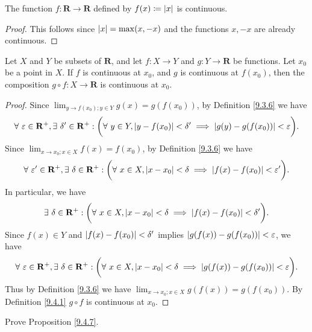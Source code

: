 \begin{proposition}\label{9.4.12}
    The function \(f : \mathbf{R} \to \mathbf{R}\) defined by \(f(x) \coloneqq \abs*{x}\) is continuous.
\end{proposition}

\begin{proof}
    This follows since \(\abs*{x} = \max(x, -x)\) and the functions \(x, -x\) are already continuous.
\end{proof}

\begin{proposition}\label{9.4.13}
    Let \(X\) and \(Y\) be subsets of \(\mathbf{R}\), and let \(f : X \to Y\) and \(g : Y \to \mathbf{R}\) be functions.
    Let \(x_0\) be a point in \(X\).
    If \(f\) is continuous at \(x_0\), and \(g\) is continuous at \(f(x_0)\), then the composition \(g \circ f : X \to \mathbf{R}\) is continuous at \(x_0\).
\end{proposition}

\begin{proof}
    Since \(\lim_{y \to f(x_0) ; y \in Y} g(x) = g(f(x_0))\), by Definition \ref{9.3.6} we have
    \[
        \forall\ \varepsilon \in \mathbf{R}^+, \exists\ \delta' \in \mathbf{R}^+ : \bigg(\forall\ y \in Y, \abs*{y - f(x_0)} < \delta' \implies \abs*{g(y) - g(f(x_0))} < \varepsilon\bigg).
    \]
    Since \(\lim_{x \to x_0 ; x \in X} f(x) = f(x_0)\), by Definition \ref{9.3.6} we have
    \[
        \forall\ \varepsilon' \in \mathbf{R}^+, \exists\ \delta \in \mathbf{R}^+ : \bigg(\forall\ x \in X, \abs*{x - x_0} < \delta \implies \abs*{f(x) - f(x_0)} < \varepsilon'\bigg).
    \]
    In particular, we have
    \[
        \exists\ \delta \in \mathbf{R}^+ : \bigg(\forall\ x \in X, \abs*{x - x_0} < \delta \implies \abs*{f(x) - f(x_0)} < \delta'\bigg).
    \]
    Since \(f(x) \in Y\) and \(\abs*{f(x) - f(x_0)} < \delta'\) implies \(\abs*{g(f(x)) - g(f(x_0))} < \varepsilon\), we have
    \[
        \forall\ \varepsilon \in \mathbf{R}^+, \exists\ \delta \in \mathbf{R}^+ : \bigg(\forall\ x \in X, \abs*{x - x_0} < \delta \implies \abs*{g(f(x)) - g(f(x_0))} < \varepsilon\bigg).
    \]
    Thus by Definition \ref{9.3.6} we have \(\lim_{x \to x_0 ; x \in X} g(f(x)) = g(f(x_0))\).
    By Definition \ref{9.4.1} \(g \circ f\) is continuous at \(x_0\).
\end{proof}

\exercisesection

\begin{exercise}\label{ex 9.4.1}
    Prove Proposition \ref{9.4.7}.
\end{exercise}

